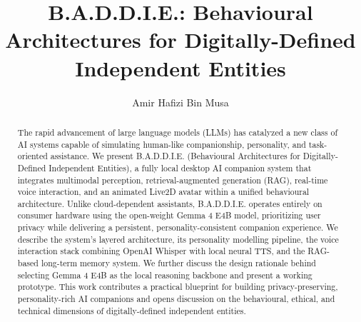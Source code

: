 \documentclass[sigconf]{acmart}
\begin{document}
\title{B.A.D.D.I.E.: Behavioural Architectures for Digitally-Defined Independent Entities}

\author{Amir Hafizi Bin Musa}

\begin{abstract}
The rapid advancement of large language models (LLMs) has catalyzed a new class of AI systems capable of simulating human-like companionship, personality, and task-oriented assistance. We present B.A.D.D.I.E. (Behavioural Architectures for Digitally-Defined Independent Entities), a fully local desktop AI companion system that integrates multimodal perception, retrieval-augmented generation (RAG), real-time voice interaction, and an animated Live2D avatar within a unified behavioural architecture. Unlike cloud-dependent assistants, B.A.D.D.I.E. operates entirely on consumer hardware using the open-weight Gemma 4 E4B model, prioritizing user privacy while delivering a persistent, personality-consistent companion experience. We describe the system's layered architecture, its personality modelling pipeline, the voice interaction stack combining OpenAI Whisper with local neural TTS, and the RAG-based long-term memory system. We further discuss the design rationale behind selecting Gemma 4 E4B as the local reasoning backbone and present a working prototype. This work contributes a practical blueprint for building privacy-preserving, personality-rich AI companions and opens discussion on the behavioural, ethical, and technical dimensions of digitally-defined independent entities.
\end{abstract}



\maketitle
\end{document}
